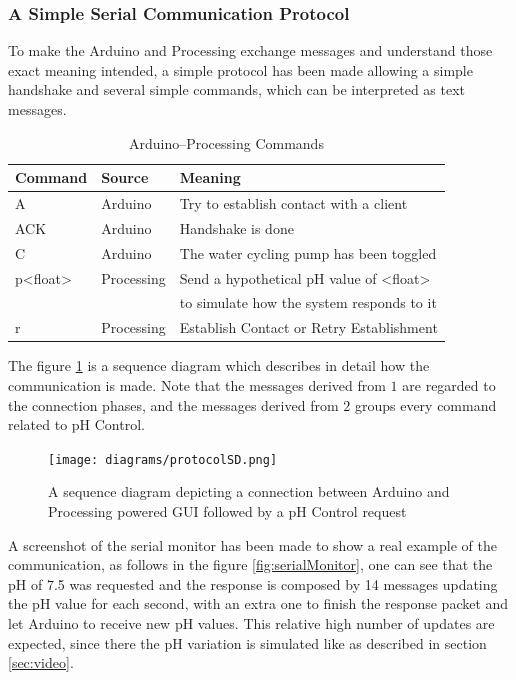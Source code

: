 \subsubsection{A Simple Serial Communication Protocol}

To make the Arduino and Processing exchange messages and understand those exact meaning intended,
a simple protocol has been made allowing a simple handshake and several simple commands,
which can be interpreted as text messages.

\begin{table}[h!]
\centering
\caption{Arduino--Processing Commands}
\label{tab:commands}
\begin{tabular}[h]{|l|l|l|}
    \hline
    \textbf{Command}     & \textbf{Source}    & \textbf{Meaning}
    \\\hline
    A           & Arduino    & Try to establish contact with a client
    \\\hline
    ACK         & Arduino    & Handshake is done
    \\\hline
    C           & Arduino    & The water cycling pump has been toggled
    \\\hline
    p<float>    & Processing & Send a hypothetical pH value of <float> \\ 
                &            & to simulate how the system responds to it
    \\\hline
    r           & Processing & Establish Contact or Retry Establishment
    \\\hline
\end{tabular}
\end{table}

The figure \ref{fig:sdProtocol} is a sequence diagram which describes in detail how the communication is made.
Note that the messages derived from $1$ are regarded to the connection phases,
and the messages derived from $2$ groups every command related to pH Control.

\begin{figure}[h!]
    \centering
    \texttt{[image: diagrams/protocolSD.png]}
    \caption{A sequence diagram depicting a connection between Arduino and Processing powered GUI followed by a pH Control request}
    \label{fig:sdProtocol}
\end{figure}

A screenshot of the serial monitor has been made to show a real example of the communication,
as follows in the figure \ref{fig:serialMonitor},
one can see that the pH of 7.5 was requested and the response is composed by 14 messages updating the pH value for each second,
with an extra one to finish the response packet and let Arduino to receive new pH values.
This relative high number of updates are expected,
since there the pH variation is simulated like as described in section \ref{sec:video}.

